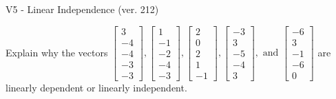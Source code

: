 \begin{exercise}
  \begin{exerciseTitle}V5 - Linear Independence (ver. 212)\end{exerciseTitle}
  \begin{exerciseStatement}
    Explain why the vectors \(\left[\begin{array}{r}
3 \\
-4 \\
-4 \\
-3 \\
-3
\end{array}\right] , \left[\begin{array}{r}
1 \\
-1 \\
-2 \\
-4 \\
-3
\end{array}\right] , \left[\begin{array}{r}
2 \\
0 \\
2 \\
1 \\
-1
\end{array}\right] , \left[\begin{array}{r}
-3 \\
3 \\
-5 \\
-4 \\
3
\end{array}\right] , \text{ and } \left[\begin{array}{r}
-6 \\
3 \\
-1 \\
-6 \\
0
\end{array}\right]\) are linearly dependent or linearly independent.	



\end{exerciseStatement}
\end{exercise}
